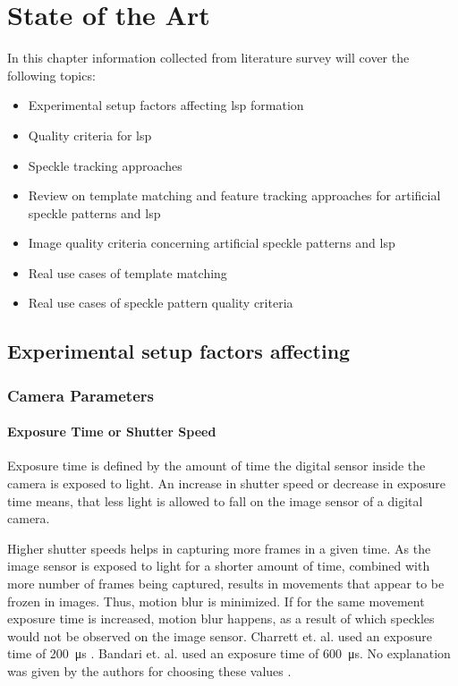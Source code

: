 \chapter{State of the Art}\label{chapter:sota}
In this chapter information collected from literature survey will cover the following topics:

\begin{itemize}
    \item Experimental setup factors affecting \gls{lsp} formation
    \item Quality criteria for \gls{lsp}
    \item Speckle tracking approaches
    \item Review on template matching and feature tracking approaches for artificial speckle patterns and \gls{lsp}
    \item Image quality criteria concerning artificial speckle patterns and \gls{lsp}
    \item Real use cases of template matching
    \item Real use cases of speckle pattern quality criteria
\end{itemize}

\section{Experimental setup factors affecting }

\subsection{Camera Parameters}

    \subsubsection{Exposure Time or Shutter Speed}\label{Subsubsection:Exposure_Time}
    Exposure time is defined by the amount of time the digital sensor inside the camera is exposed to light. An increase in shutter speed or decrease in exposure time means, that less light is allowed to fall on the image sensor of a digital camera.

    \vspace{5mm}
    \noindent Higher shutter speeds helps in capturing more frames in a given time. As the image sensor is exposed to light for a shorter amount of time, combined with more number of frames being captured, results in movements that appear to be frozen in images. Thus, motion blur is minimized. If for the same movement exposure time is increased, motion blur happens, as a result of which speckles would not be observed on the image sensor. Charrett et. al.  used an exposure time of \SI{200}{\micro\second} \cite{charrett_2018}. Bandari et. al. used an exposure time of \SI{600}{\micro\second}. No explanation was given by the authors for choosing these values \cite{bandari}.

